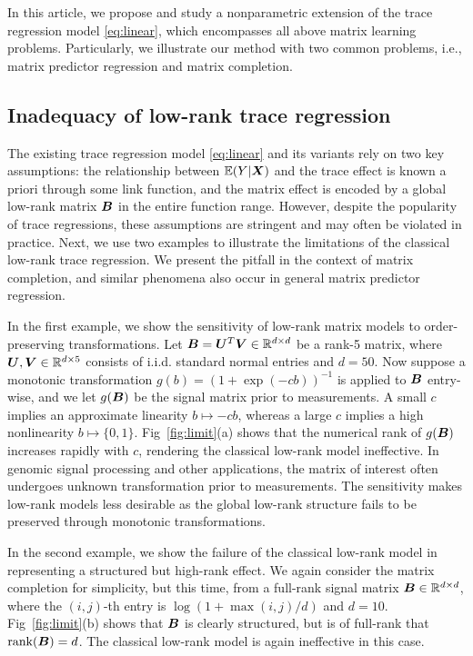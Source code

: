 \documentclass[aos]{imsart}
\theoremstyle{definition}
\begin{document}
\noindent
In this article, we propose and study a nonparametric extension of the trace regression model \eqref{eq:linear}, which encompasses all above matrix learning problems. Particularly, we illustrate our method with two common problems, i.e., matrix predictor regression and matrix completion.



\subsection{Inadequacy of low-rank trace regression}
\label{sec:limit}

The existing trace regression model \eqref{eq:linear} and its variants rely on two key assumptions: the relationship between $\mathbb{E}(Y|\bm X)$ and the trace effect is known a priori through some link function, and the matrix effect is encoded by a global low-rank matrix $\bm B$ in the entire function range. However, despite the popularity of trace regressions, these assumptions are stringent and may often be violated in practice. Next, we use two examples to illustrate the limitations of the classical low-rank trace regression. We present the pitfall in the context of matrix completion, and similar phenomena also occur in general matrix predictor regression. 

In the first example, we show the sensitivity of low-rank matrix models to order-preserving transformations. Let $\bm B=\bm{U}^T\bm{V} \in \mathbb{R}^{d\times d}$ be a rank-5 matrix, where $\bm{U}, \bm{V} \in\mathbb{R}^{d\times 5}$ consists of i.i.d. standard normal entries and $d=50$. Now suppose a monotonic transformation $g(b)=(1+\exp(-cb))^{-1}$ is applied to $\bm B$ entry-wise, and we let $g(\bm B)$ be the signal matrix prior to measurements. A small $c$ implies an approximate linearity $b\mapsto -cb$, whereas a large $c$ implies a high nonlinearity $b\mapsto \{0,1\}$. Fig~\ref{fig:limit}(a) shows that the numerical rank of $g(\bm B)$ increases rapidly with $c$, rendering the classical low-rank model ineffective. In genomic signal processing and other applications, the matrix of interest often undergoes unknown transformation prior to measurements. The sensitivity makes low-rank models less desirable as the global low-rank structure fails to be preserved through monotonic transformations.

In the second example, we show the failure of the classical low-rank model in representing a structured but high-rank effect. We again consider the matrix completion for simplicity, but this time, from a full-rank signal matrix $\bm B\in\mathbb{R}^{d\times d}$, where the $(i,j)$-th entry is $\log(1+\max(i,j)/d)$ and $d=10$. Fig~\ref{fig:limit}(b) shows that $\bm B$ is clearly structured, but is of full-rank that $\text{rank}(\bm B)=d$. The classical low-rank model is again ineffective in this case. 
\end{document}

